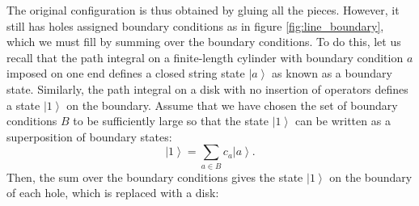 The original configuration is thus obtained by gluing all the pieces.
However, it still has holes assigned boundary conditions as in figure \ref{fig:line_boundary},
which we must fill by summing over the boundary conditions. To do
this, let us recall that the path integral on a finite-length cylinder
with boundary condition $a$ imposed on one end defines a closed string
state $\left|a\right\rangle $ as known as a boundary state. Similarly,
the path integral on a disk with no insertion of operators defines
a state $\left|1\right\rangle $ on the boundary.
Assume
that we have chosen the set of boundary conditions $B$ to be sufficiently
large so that the state $\left|1\right\rangle $ can be written as
a superposition of boundary states:
\begin{equation}
  \left|1\right\rangle  =  \sum_{a\in B}c_{a}\left|a\right\rangle .
\end{equation}
Then, the sum over the boundary conditions gives the state $\left|1\right\rangle $
on the boundary of each hole, which is replaced with a disk:
